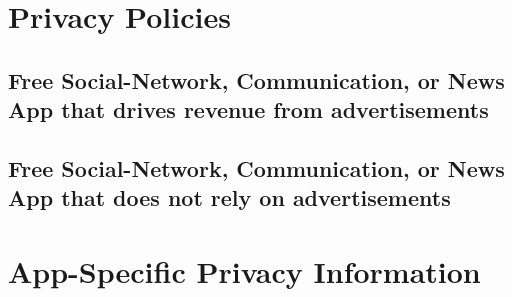 \documentclass{report}
\begin{document}
	
	\section{Privacy Policies}
	\startsection
		\subsection{Free Social-Network, Communication, or News App that drives revenue from advertisements \cite{YouTubePP}}
		\startsubsection
		\closesection
		\subsection{Free Social-Network, Communication, or News App that does not rely on advertisements}
		\startsubsection
		\closesection
	\closesection
	
	\section{App-Specific Privacy Information}
	\startsection
	\closesection
	
	{\let\clearpage\relax }
\end{document}
